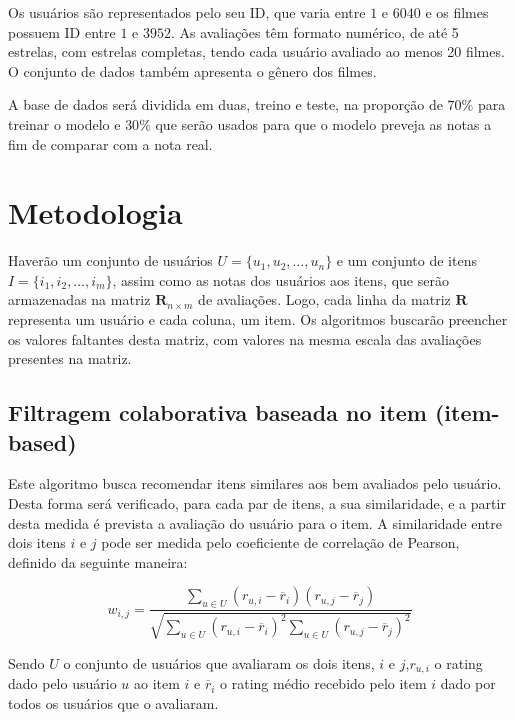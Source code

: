 \documentclass[12pt,a4paper,header]{abnt}
\begin{document}
Os usuários são representados pelo seu ID, que varia entre $1$ e $6040$ e os filmes possuem ID entre $1$ e $3952$. As avaliações têm formato numérico, de até 5 estrelas, com estrelas completas, tendo cada usuário avaliado ao menos 20 filmes. O conjunto de dados também apresenta o gênero dos filmes.

A base de dados será dividida em duas, treino e teste, na proporção de $70\%$ para treinar o modelo e $30\%$ que serão usados para que o modelo preveja as notas a fim de comparar com a nota real.

\section{Metodologia}

Haverão um conjunto de usuários $U = \{u_1, u_2, \ldots, u_n\}$ e um conjunto de itens $I = \{i_1, i_2, \ldots, i_m \}$, assim como as notas dos usuários aos itens, que serão armazenadas na matriz $\boldsymbol{R}_{n \times m}$ de avaliações\cite{hahsler2015recommenderlab}. Logo, cada linha da matriz $\boldsymbol{R}$ representa um usuário e cada coluna, um item. Os algoritmos buscarão preencher os valores faltantes desta matriz, com valores na mesma escala das avaliações presentes na matriz\cite{takahashi2015estudo}.

\subsection{Filtragem colaborativa baseada no item (item-based)}

Este algoritmo busca recomendar itens similares aos bem avaliados pelo usuário. Desta forma será verificado, para cada par de itens, a sua similaridade, e a partir desta medida é prevista a avaliação do usuário para o item. A similaridade entre dois itens $i$ e $j$ pode ser medida pelo coeficiente de correlação de Pearson, definido da seguinte maneira\cite{melville2011recommender}:

\begin{equation}
w_{i, j} = \frac{\sum_{u \in U}{(r_{u, i} - \overline{r}_i ) ( r_{u, j} - \overline{r}_j )}}{\sqrt{\sum_{u \in U}{(r_{u, i} - \overline{r}_i )^2} \sum_{u \in U}{(r_{u, j} - \overline{r}_j )^2}}}
\end{equation}

Sendo $U$ o conjunto de usuários que avaliaram os dois itens, $i$ e $j$,$r_{u, i}$ o rating dado pelo usuário $u$ ao item $i$ e $\overline{r}_i$ o rating médio recebido pelo item $i$ dado por todos os usuários que o avaliaram.
\end{document}
